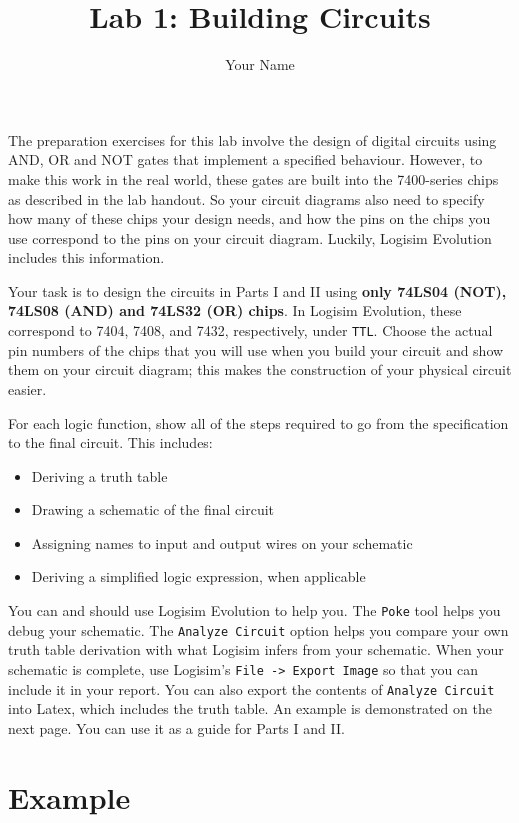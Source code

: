 \documentclass{article}
\title{Lab 1: Building Circuits}
\author{Your Name}
\begin{document}
\maketitle

The preparation exercises for this lab involve the design of digital circuits using AND, OR and NOT gates that implement a specified behaviour.
However, to make this work in the real world, these gates are built into the 7400-series chips as described in the lab handout.
So your circuit diagrams also need to specify how many of these chips your design needs, and how the pins on the chips you use correspond to the pins on your circuit diagram.
Luckily, Logisim Evolution includes this information.

Your task is to design the circuits in Parts I and II using \textbf{only 74LS04 (NOT), 74LS08 (AND) and 74LS32 (OR) chips}.
In Logisim Evolution, these correspond to 7404, 7408, and 7432, respectively, under \verb|TTL|.
Choose the actual pin numbers of the chips that you will use when you build your circuit and show them on your circuit diagram;
this makes the construction of your physical circuit easier.

For each logic function, show all of the steps required to go from the specification to the final circuit.
This includes:

\begin{itemize}
\item Deriving a truth table
\item Drawing a schematic of the final circuit
\item Assigning names to input and output wires on your schematic
\item Deriving a simplified logic expression, when applicable
\end{itemize}

You can and should use Logisim Evolution to help you.
The \verb|Poke| tool helps you debug your schematic.
The \verb|Analyze Circuit| option helps you compare your own truth table derivation with what Logisim infers from your schematic.
When your schematic is complete, use Logisim's \verb|File -> Export Image| so that you can include it in your report.
You can also export the contents of \verb|Analyze Circuit| into Latex, which includes the truth table.
An example is demonstrated on the next page.
You can use it as a guide for Parts I and II.

\newpage
\section*{Example}
\end{document}
